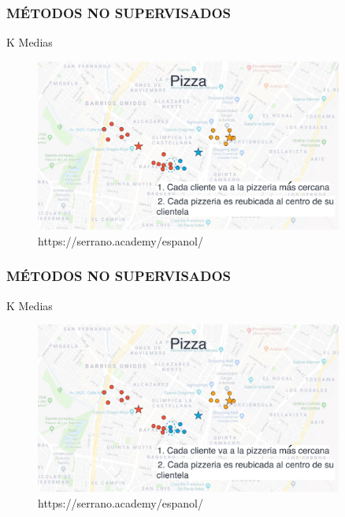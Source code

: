 \documentclass{beamer}
\begin{document}
\begin{frame}
	\frametitle{MÉTODOS NO SUPERVISADOS}
	\begin{block}{K Medias}	
		\begin{figure}
			\includegraphics[width=0.9\textwidth]{Imagenes_k_means/IMG_3515.jpg}
			\caption{https://serrano.academy/espanol/}
		\end{figure}
	\end{block}
\end{frame}

\begin{frame}
	\frametitle{MÉTODOS NO SUPERVISADOS}
	\begin{block}{K Medias}	
		\begin{figure}
			\includegraphics[width=0.9\textwidth]{Imagenes_k_means/IMG_3516.jpg}
			\caption{https://serrano.academy/espanol/}
		\end{figure}
	\end{block}
\end{frame}
\end{document}
